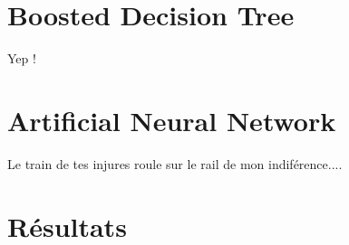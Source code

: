 \label{sec:unchapitre}

\section{Boosted Decision Tree}

Yep !

\section{Artificial Neural Network}

Le train de tes injures roule sur le rail de mon indiférence....

\section{Résultats}



